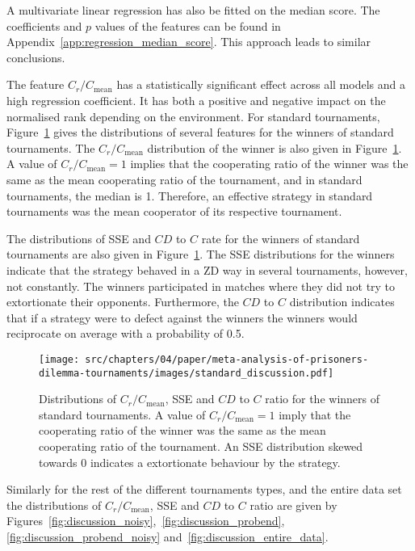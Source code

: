A multivariate linear regression has also be fitted on the median score. The
coefficients and \(p\) values of the features can be found in
Appendix~\ref{app:regression_median_score}. This approach leads to similar conclusions.

The feature \(C_{r} / C_{\text{mean}}\) has a statistically significant effect
across all models and a high regression coefficient. It has both a positive and
negative impact on the normalised rank depending on the environment. For
standard tournaments, Figure~\ref{fig:discussion_standard} gives the
distributions of several features for the winners of standard tournaments. The
\(C_{r} / C_{\text{mean}}\) distribution of the winner is also given in
Figure~\ref{fig:discussion_standard}. A value of \(C_r / C_{\text{mean}} = 1\)
implies that the cooperating ratio of the winner was the same as the mean
cooperating ratio of the tournament, and in standard tournaments, the median is
1. Therefore, an effective strategy in standard tournaments was the mean
cooperator of its respective tournament.

The distributions of SSE and \(CD\) to \(C\) rate for the winners of standard
tournaments are also given in Figure~\ref{fig:discussion_standard}. The SSE
distributions for the winners indicate that the strategy behaved in a ZD way in
several tournaments, however, not constantly. The winners participated in
matches where they did not try to extortionate their opponents. Furthermore, the
\(CD\) to \(C\) distribution indicates that if a strategy were to defect against
the winners the winners would reciprocate on average with a probability of 0.5.

\begin{figure}[!htbp]
    \centering
        \centering
        \texttt{[image: src/chapters/04/paper/meta-analysis-of-prisoners-dilemma-tournaments/images/standard\_discussion.pdf]}
        \caption{Distributions of \(C_r / C_{\text{mean}}\), SSE and \(CD\) to \(C\) ratio
        for the winners of standard tournaments. A
        value of \(C_r / C_{\text{mean}} = 1\) imply that the cooperating ratio of the
        winner was the same as the mean cooperating ratio of the tournament. An SSE distribution
        skewed towards 0 indicates a extortionate behaviour by the strategy.}
        \label{fig:discussion_standard}
\end{figure}

Similarly for the rest of the different tournaments types, and the entire data
set the distributions of \(C_r / C_{\text{mean}}\), SSE and \(CD\) to \(C\) ratio
are given by Figures~\ref{fig:discussion_noisy},~\ref{fig:discussion_probend},
\ref{fig:discussion_probend_noisy} and~\ref{fig:discussion_entire_data}.

